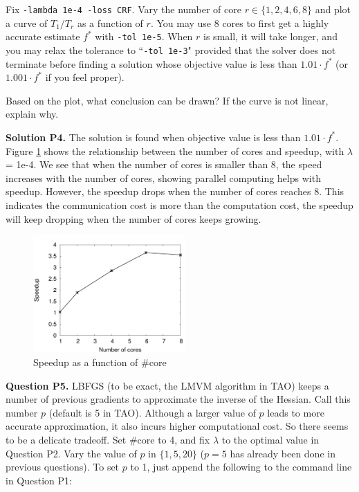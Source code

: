 \documentclass[11pt]{report}
\begin{document}
{Fix \verb!-lambda 1e-4 -loss CRF!.
Vary the number of core $r \in \{1, 2, 4, 6, 8\}$ and plot a curve of $T_1 / T_r$ as a function of $r$.
You may use 8 cores to first get a highly accurate estimate $f^*$ with \verb!-tol 1e-5!.
When $r$ is small, it will take longer, and you may relax the tolerance to ``\verb!-tol 1e-3!" provided that the solver does not terminate before finding a solution whose objective value is less than $1.01 \cdot f^*$ (or $1.001 \cdot f^*$ if you feel proper).

Based on the plot, what conclusion can be drawn?
If the curve is not linear, explain why.

{\bf Solution P4.}
The solution is found when objective value is less than $1.01 \cdot f^*$. Figure \ref{fig:scalability} shows the relationship between the number of cores and speedup, with $\lambda$ = {\sf 1e-4}. We see that when the number of cores is smaller than 8, the speed increases with the number of cores, showing parallel computing helps with speedup. However, the speedup drops when the number of cores reaches 8. This indicates the communication cost is more than the computation cost, the speedup will keep dropping when the number of cores keeps growing. 

\begin{figure}[htbp!]
\centering
\includegraphics[width=5.8cm]{p4_scalability}
\caption{Speedup as a function of \#core}
\label{fig:scalability}
\end{figure}

{\bf Question P5.}
LBFGS (to be exact, the LMVM algorithm in TAO) keeps a number of previous gradients to approximate the inverse of the Hessian.
Call this number $p$ (default is 5 in TAO).
Although a larger value of $p$ leads to more accurate approximation, it also incurs higher computational cost.
So there seems to be a delicate tradeoff.
Set \#core to 4, and fix $\lambda$ to the optimal value in Question P2.
Vary the value of $p$ in $\{1, 5, 20\}$ ($p=5$ has already been done in previous questions).
To set $p$ to 1, just append the following to the command line in Question P1:

}
\end{document}
